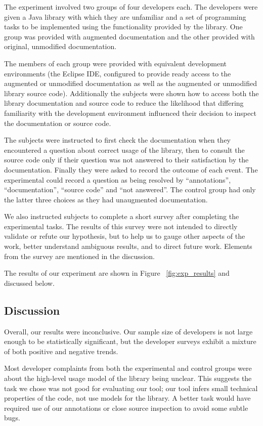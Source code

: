 The experiment involved two groups of four developers each. The developers were
given a Java library with which they are unfamiliar and a set of programming
tasks to be implemented using the functionality provided by the library. One
group was provided with augmented documentation and the other provided with
original, unmodified documentation.

The members of each group were provided with equivalent development
environments (the Eclipse IDE, configured to provide ready access to the
augmented or unmodified documentation as well as the augmented or unmodified
library source code). Additionally the subjects were shown how to access both
the library documentation and source code to reduce the likelihood that
differing familiarity with the development environment influenced their
decision to inspect the documentation or source code.

The subjects were instructed to first check the documentation when they
encountered a question about correct usage of the library, then to consult the
source code only if their question was not answered to their satisfaction by
the documentation. Finally they were asked to record the outcome of each event.
The experimental could record a question as being resolved by ``annotations'',
``documentation'', ``source code'' and ``not answered''. The control group had
only the latter three choices as they had unaugmented documentation.

We also instructed subjects to complete a short survey after completing the
experimental tasks. The results of this survey were not intended to directly
validate or refute our hypothesis, but to help us to gauge other aspects of the
work, better understand ambiguous results, and to direct future work. Elements
from the survey are mentioned in the discussion.

The results of our experiment are shown in Figure ~\ref{fig:exp_results} and
discussed below.

\subsection{Discussion}
Overall, our results were inconclusive.  Our sample size of developers is not
large enough to be statistically significant, but the developer surveys exhibit
a mixture of both positive and negative trends.

Most developer complaints from both the experimental and control groups were
about the high-level usage model of the library being unclear.  This suggests the task we chose was
not good for evaluating our tool; our tool infers small technical
properties of the code, not use models for the library.  A better task would
have required use of our annotations or close source inspection to avoid some subtle bugs.

